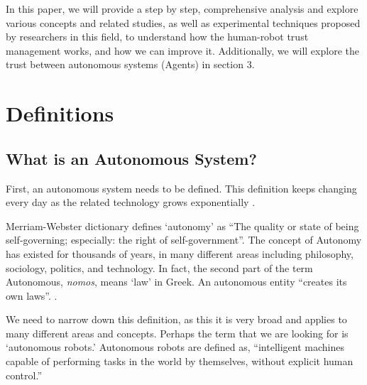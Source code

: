 \documentclass[runningheads,a4paper]{llncs}
\begin{document}
In this paper, we will provide a step by step, comprehensive analysis and explore various concepts and related studies, as well as experimental techniques proposed by researchers in this field, to understand how the human-robot trust management works, and how we can improve it. Additionally, we will explore the trust between autonomous systems (Agents) in section 3.

\section{Definitions}
\subsection{What is an Autonomous System?}
First, an autonomous system needs to be defined. This definition keeps changing every day as the related technology grows exponentially \cite{schaefer2013perception}.

Merriam-Webster dictionary defines `autonomy' as  ``The quality or state of being self-governing; especially: the right of self-government''. The concept of Autonomy has existed for thousands of years, in many different areas including philosophy, sociology, politics, and technology. In fact, the second part of the term Autonomous, \textsl{nomos}, means `law' in  Greek. An autonomous entity ``creates its own laws''. \cite{MerriamWebsterAtn}. 

We need to narrow down this definition, as this it is very broad and applies to many different areas and concepts. Perhaps the term that we are looking for is `autonomous robots.' Autonomous robots are defined as, ``intelligent machines capable of performing tasks in the world by themselves, without explicit human control.'' \cite{Bekey:2005:ARB:1088950}
\end{document}
